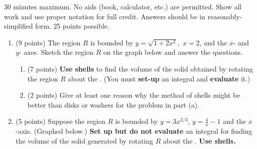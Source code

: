\documentclass[12pt]{article}
\begin{document}
30 minutes maximum.  No aids (book, calculator, etc.) are permitted.  Show all work and use proper notation for full credit.  Answers should be in reasonably-simplified form.  25 points possible.

\begin{enumerate}
\item (9 points) The region $R$ is bounded by $y=\sqrt{1+2x^2},$ $x=2$, and the $x$- and $y$- axes. Sketch the region $R$ on the graph below and answer the questions. \\

	\begin{enumerate}
	\item (7 points) \textbf{Use shells} to find the volume of the solid obtained by rotating the region $R$ about the . (You must \textbf{set-up} an integral and \textbf{evaluate} it.)\\
	\vfill
	
	\vfill
	
	\item (2 points) Give at least one reason why the method of shells might be better than disks or washers for the problem in part (a).\\	
	\vspace{.5in}
	
	\end{enumerate}
\newpage
\item (5 points)  Suppose the region $R$ is bounded by  $y=3x^{2/3}$, $y=\frac{4}{x} -1$ and the $x$-axis. (Graphed below.) \textbf{Set up but do not evaluate} an integral for finding the volume of the solid generated by rotating $R$ about the . \textbf{Use shells.}\\


\end{enumerate}
\end{document}
